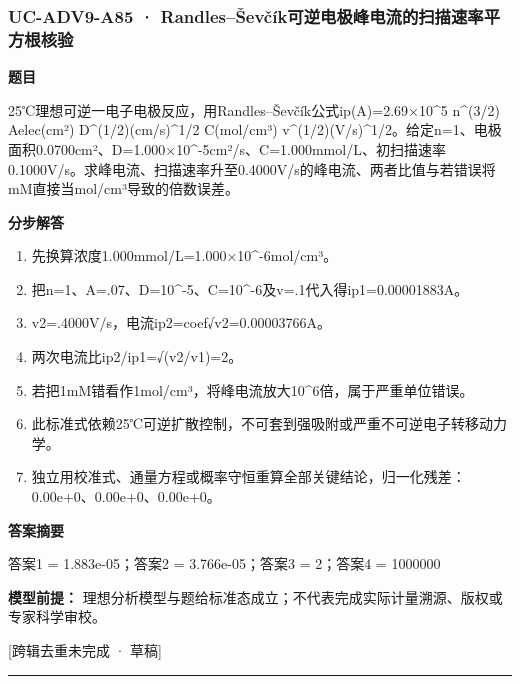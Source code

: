 \documentclass[UTF8,11pt,a4paper]{ctexart}
\begin{document}
\subsubsection*{UC-ADV9-A85 · Randles–Ševčík可逆电极峰电流的扫描速率平方根核验}
\noindent\textbf{题目}\par
25℃理想可逆一电子电极反应，用Randles–Ševčík公式ip(A)=2.69×10\textasciicircum{}5 n\textasciicircum{}(3/2) Aelec(cm²) D\textasciicircum{}(1/2)(cm/s)\textasciicircum{}1/2 C(mol/cm³) v\textasciicircum{}(1/2)(V/s)\textasciicircum{}1/2。给定n=1、电极面积0.0700cm²、D=1.000×10\textasciicircum{}-5cm²/s、C=1.000mmol/L、初扫描速率0.1000V/s。求峰电流、扫描速率升至0.4000V/s的峰电流、两者比值与若错误将mM直接当mol/cm³导致的倍数误差。\par
\medskip\noindent\textbf{分步解答}
\begin{enumerate}
\item 先换算浓度1.000mmol/L=1.000×10\textasciicircum{}-6mol/cm³。
\item 把n=1、A=.07、D=10\textasciicircum{}-5、C=10\textasciicircum{}-6及v=.1代入得ip1=0.00001883A。
\item v2=.4000V/s，电流ip2=coef√v2=0.00003766A。
\item 两次电流比ip2/ip1=√(v2/v1)=2。
\item 若把1mM错看作1mol/cm³，将峰电流放大10\textasciicircum{}6倍，属于严重单位错误。
\item 此标准式依赖25℃可逆扩散控制，不可套到强吸附或严重不可逆电子转移动力学。
\item 独立用校准式、通量方程或概率守恒重算全部关键结论，归一化残差：0.00e+0、0.00e+0、0.00e+0。
\end{enumerate}
\noindent\textbf{答案摘要}\par
答案1 = 1.883e-05；答案2 = 3.766e-05；答案3 = 2；答案4 = 1000000\par
\noindent\textbf{模型前提：}
理想分析模型与题给标准态成立；不代表完成实际计量溯源、版权或专家科学审校。\par
\noindent\textcolor{red!65!black}{[跨辑去重未完成 · 草稿]} \par
\medskip\hrule\medskip
{}
\end{document}
